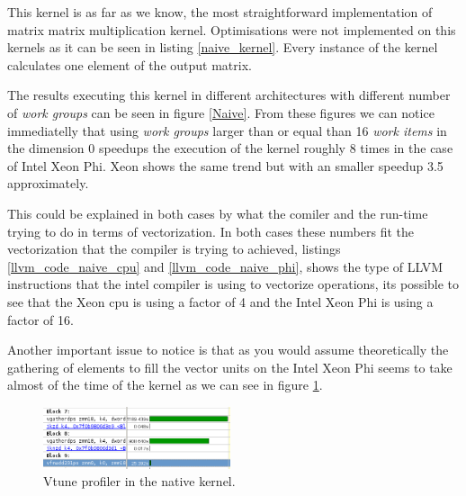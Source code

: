 \par{This kernel is as far as we know, the most straightforward implementation of matrix matrix multiplication kernel.
    Optimisations were not implemented on this kernels as it can be seen in listing \ref{naive_kernel}. Every instance
    of the kernel calculates one element of the output matrix.}



\par{The results executing this kernel in different architectures with different number of \emph{work groups } can be seen 
in figure \ref{Naive}. From these figures we can notice immediatelly that using \emph{work groups} larger than or equal than 16
\emph{work items} in the dimension 0 speedups the execution of the kernel roughly 8 times in the case of Intel Xeon Phi.
Xeon shows the same trend but with an smaller speedup 3.5 approximately.}





\par{This could be explained in both cases by what the comiler and the run-time trying to do in terms of vectorization. In both 
cases these numbers fit the vectorization that the compiler is trying to achieved, listings 
\ref{llvm_code_naive_cpu} and \ref{llvm_code_naive_phi}, shows the type of LLVM instructions that the intel compiler is using to 
vectorize operations, its possible to see that the Xeon cpu is using a factor of 4 and the Intel Xeon Phi is using a factor of 16.}

\par{Another important issue to notice is that as you would assume theoretically the gathering of elements to fill the vector 
units on the Intel Xeon Phi seems to take almost of the time of the kernel as we can see in figure \ref{vtune_naive}.}

\begin{figure}[!h]
    \centering
    \includegraphics[width=0.49\textwidth]{figures/vtune_naive.png}
    \caption{Vtune profiler in the native kernel.}
    \label{vtune_naive}
\end{figure}

